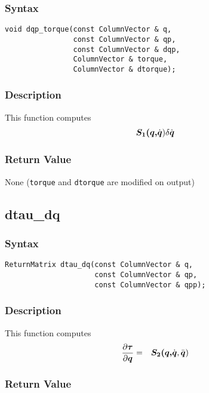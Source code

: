 \documentclass[11pt,fleqn,letterpaper]{report}
\newcommand{\mbold}[1]{\mbox{\boldmath $ #1 $}}
\newcommand{\dfdx}[2]{\frac{\partial #1}{\partial #2}}
\begin{document}
\subsubsection*{Syntax}
\begin{verbatim}
void dqp_torque(const ColumnVector & q, 
                const ColumnVector & qp,
                const ColumnVector & dqp, 
                ColumnVector & torque,
                ColumnVector & dtorque);
\end{verbatim}
\subsubsection*{Description}
This function computes 
\begin{eqnarray}
\mbold{S_1(q,}\dot{\mbold{q}}) \delta \dot{\mbold{q}}
\end{eqnarray}


\subsubsection*{Return Value}

None ({\tt torque} and {\tt dtorque} are modified on output)

\newpage

\subsection*{dtau\_dq}
\subsubsection*{Syntax}
\begin{verbatim}
ReturnMatrix dtau_dq(const ColumnVector & q, 
                     const ColumnVector & qp,
                     const ColumnVector & qpp);
\end{verbatim}
\subsubsection*{Description}
This function computes 
\begin{eqnarray}
\dfdx{\mbold{\tau}}{\mbold{q}} & = & \mbold{S_2(q,}\dot{\mbold{q}},\ddot{\mbold{q}})
\end{eqnarray}


\subsubsection*{Return Value}
\end{document}
